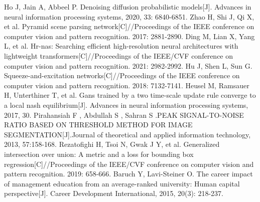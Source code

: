 \documentclass[sn-mathphys]{sn-jnl}%
\theoremstyle{thmstyleone}%
\theoremstyle{thmstyletwo}%
\theoremstyle{thmstylethree}%
\begin{document}
\begin{thebibliography}{00}
	 Ho J, Jain A, Abbeel P. Denoising diffusion probabilistic models[J]. Advances in neural information processing systems, 2020, 33: 6840-6851.
	 Zhao H, Shi J, Qi X, et al. Pyramid scene parsing network[C]//Proceedings of the IEEE conference on computer vision and pattern recognition. 2017: 2881-2890.
	 Ding M, Lian X, Yang L, et al. Hr-nas: Searching efficient high-resolution neural architectures with lightweight transformers[C]//Proceedings of the IEEE/CVF conference on computer vision and pattern recognition. 2021: 2982-2992.
	 Hu J, Shen L, Sun G. Squeeze-and-excitation networks[C]//Proceedings of the IEEE conference on computer vision and pattern recognition. 2018: 7132-7141.
	 Heusel M, Ramsauer H, Unterthiner T, et al. Gans trained by a two time-scale update rule converge to a local nash equilibrium[J]. Advances in neural information processing systems, 2017, 30.
	 Pirahansiah F , Abdullah S , Sahran S .PEAK SIGNAL-TO-NOISE RATIO BASED ON THRESHOLD METHOD FOR IMAGE SEGMENTATION[J].Journal of theoretical and applied information technology, 2013, 57:158-168.
	 Rezatofighi H, Tsoi N, Gwak J Y, et al. Generalized intersection over union: A metric and a loss for bounding box regression[C]//Proceedings of the IEEE/CVF conference on computer vision and pattern recognition. 2019: 658-666.
	 Baruch Y, Lavi-Steiner O. The career impact of management education from an average-ranked university: Human capital perspective[J]. Career Development International, 2015, 20(3): 218-237.
\end{thebibliography}
\end{document}
